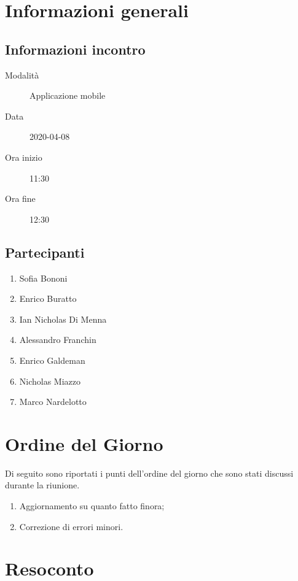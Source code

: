 \documentclass{article}
\begin{document}


\section{Informazioni generali}%
\label{sec:informazioni_generali}

\subsection{Informazioni incontro}%
\label{sub:informazioni_incontro}

\begin{description}
  \item[Modalità] Applicazione mobile 
  \item[Data] 2020-04-08
  \item[Ora inizio] 11:30
  \item[Ora fine] 12:30
\end{description}

\subsection{Partecipanti}%
\label{sub:partecipanti}

\begin{enumerate}
  \item Sofia Bononi
  \item Enrico Buratto
  \item Ian Nicholas Di Menna
  \item Alessandro Franchin
  \item Enrico Galdeman
  \item Nicholas Miazzo
  \item Marco Nardelotto
\end{enumerate}

\section{Ordine del Giorno}%
\label{ordine_del_giorno}
Di seguito sono riportati i punti dell'ordine del giorno che sono stati discussi durante la riunione.
\begin{enumerate}
  \item Aggiornamento su quanto fatto finora;
  \item Correzione di errori minori.
\end{enumerate}

\section{Resoconto}%
\label{resoconto}
\end{document}
